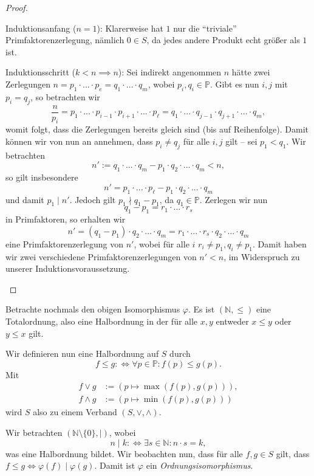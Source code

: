 \begin{proof}
\begin{itemize}[topsep=0cm, label={--}]
        Induktionsanfang ($n=1$): Klarerweise hat $1$ nur die ``triviale'' Primfaktorenzerlegung, nämlich $0 \in S$, da jedes andere Produkt echt größer als $1$ ist.

        Induktionsschritt ($k<n \implies n$): Sei indirekt angenommen $n$ hätte zwei Zerlegungen $n = p_1 \cdot ... \cdot p_e = q_1 \cdot ... \cdot q_m$, wobei $p_i, q_i \in \mathbb{P}$. Gibt es nun $i,j$ mit $p_i = q_j$, so betrachten wir
        $$ \frac{n}{p_i} = p_1 \cdot ... \cdot p_{i-1} \cdot p_{i+1} \cdot ... \cdot p_\ell = q_1 \cdot ... \cdot q_{j-1} \cdot q_{j+1} \cdot ... \cdot q_m, $$
        womit folgt, dass die Zerlegungen bereits gleich sind (bis auf Reihenfolge). Damit können wir von nun an annehmen, dass $p_i \neq q_j$ für alle $i, j$ gilt -- \obda sei $p_1 < q_1$. Wir betrachten
        $$ n' := q_1 \cdot ... \cdot q_m - p_1 \cdot q_2 \cdot ... \cdot q_m < n, $$
        so gilt insbesondere
        $$ n' = p_1 \cdot ... \cdot p_\ell - p_1 \cdot q_2 \cdot ... \cdot q_m $$
        und damit $p_1 \mid n'$. Jedoch gilt $p_1 \nmid q_1 - p_1$, da $q_1 \in \mathbb{P}$. Zerlegen wir nun
        $$ q_1 - p_1 = r_1 \cdot ... \cdot r_s $$
        in Primfaktoren, so erhalten wir
        $$ n' = (q_1 - p_1) \cdot q_2 \cdot ... \cdot q_m = r_1 \cdot ... \cdot r_s \cdot q_2 \cdot ... \cdot q_m $$
        eine Primfaktorenzerlegung von $n'$, wobei für alle $i$ $r_i \neq p_1, q_i \neq p_1$. Damit haben wir zwei verschiedene Primfaktorenzerlegungen von $n' < n$, im Widerspruch zu unserer Induktionsvoraussetzung.
    \end{itemize}
\end{proof}

\begin{remark}
    Betrachte nochmals den obigen Isomorphismus $\varphi$. Es ist $(\mathbb{N}, \leq)$ eine Totalordnung, also eine Halbordnung in der für alle $x,y$ entweder $x \leq y$ oder $y \leq x$ gilt.

    Wir definieren nun eine Halbordnung auf $S$ durch
    $$ f \leq g :\Leftrightarrow \forall p \in \mathbb{P}: f(p) \leq g(p). $$
    Mit 
    \begin{align*}
        f \vee g &:= (p \mapsto \max(f(p),g(p))), \\ f \wedge g &:= (p \mapsto \min(f(p),g(p)))
    \end{align*}
    wird $S$ also zu einem Verband $(S, \vee, \wedge)$.
\end{remark}

\begin{remark}
    Wir betrachten $(\mathbb{N} \setminus \{ 0 \}, \mid)$, wobei
    $$ n \mid k :\Leftrightarrow \exists s \in \mathbb{N}: n \cdot s = k, $$
    was eine Halbordnung bildet. Wir beobachten nun, dass für alle $f,g \in S$ gilt, dass $f \leq g \Leftrightarrow \varphi(f) \mid \varphi(g)$. Damit ist $\varphi$ ein \emph{Ordnungsisomorphismus}.
\end{remark}

